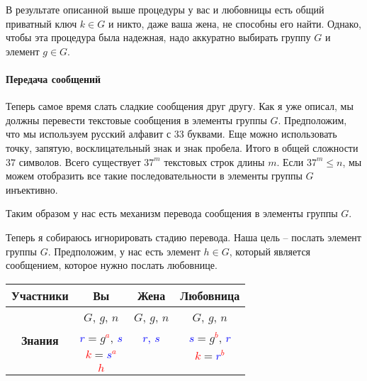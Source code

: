 В результате описанной выше процедуры у вас и любовницы есть общий приватный ключ $k\in G$ и никто, даже ваша жена, не способны его найти.
Однако, чтобы эта процедура была надежная, надо аккуратно выбирать  группу $G$ и элемент $g\in G$.

\paragraph{Передача сообщений}

Теперь самое время слать сладкие сообщения друг другу.
Как я уже описал, мы должны перевести текстовые сообщения в элементы группы $G$.
Предположим, что мы используем русский алфавит с $33$ буквами.
Еще можно использовать точку, запятую, восклицательный знак и знак пробела.
Итого в общей сложности $37$ символов.
Всего существует $37^m$ текстовых строк длины $m$.
Если $37^m \leqslant n$, мы можем отобразить все такие последовательности в элементы группы $G$ инъективно.

Таким образом у нас есть механизм перевода сообщения в элементы группы $G$.

Теперь я собираюсь игнорировать стадию перевода.
Наша цель -- послать элемент группы $G$.
Предположим, у нас есть элемент $h\in G$, который является сообщением, которое нужно послать любовнице.
\begin{center}
\begin{tabular}{|c|c|c|c|}
\hline
{\bf Участники}&{Вы}&{Жена}&{Любовница}\\
\hline
\multirow{4}{*}{\bf Знания}&{\textcolor{OliveGreen}{$G$}, \textcolor{OliveGreen}{$g$}, \textcolor{OliveGreen}{$n$}}&{\textcolor{OliveGreen}{$G$}, \textcolor{OliveGreen}{$g$}, \textcolor{OliveGreen}{$n$}}&{\textcolor{OliveGreen}{$G$}, \textcolor{OliveGreen}{$g$}, \textcolor{OliveGreen}{$n$}}\\
{}&{ \textcolor{blue}{$r$}$=$\textcolor{OliveGreen}{$ g$}\textcolor{red}{${}^a$}, \textcolor{blue}{$s$}}&{\textcolor{blue}{$r$, $s$}}&{ \textcolor{blue}{$s$}$=$\textcolor{OliveGreen}{$g$}\textcolor{red}{${}^b$}, \textcolor{blue}{$r$}}\\
{}&{ \textcolor{red}{$k$}$=$\textcolor{blue}{$s$}\textcolor{red}{${}^a$}}&{}&{ \textcolor{red}{$k$}$=$\textcolor{blue}{$r$}\textcolor{red}{${}^b$}}\\
{}&{\textcolor{red}{$h$}}&{}&{}\\
\hline
\end{tabular}
\end{center}

